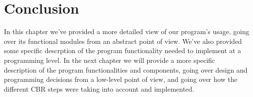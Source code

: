 \section{Conclusion}
In this chapter we've provided a more detailed view of our program's usage, going over its functional modules from an abstract point of view. 
We've also provided some specific descrption of the program functionality needed to implement at a programming level.
In the next chapter we will provide a more specific description of the program functionalities and components, going over design and programming decisions from a low-level point of view, and going over how the different CBR steps were taking into account and implemented.
\medskip
